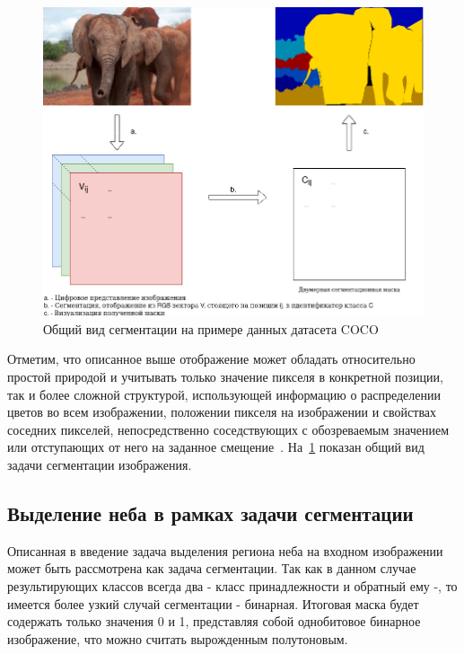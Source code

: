 \begin{figure}[H]
    \centering
    \includegraphics[width=\textwidth]{img/example_segmentation.png}
    \caption{Общий вид сегментации на примере данных датасета COCO}
    \label{fig:seg_example}
\end{figure}

Отметим, что описанное выше отображение может обладать относительно простой природой и учитывать только значение пикселя в конкретной позиции,
так и более сложной структурой, использующей информацию о распределении цветов во всем изображении, положении пикселя на изображении и
свойствах соседних пикселей, непосредственно соседствующих с обозреваемым значением или отступающих от него на заданное смещение~\autocite{liu2018recent}.
На~\ref{fig:seg_example} показан общий вид задачи сегментации изображения.

\subsection{Выделение неба в рамках задачи сегментации}

Описанная в введение задача выделения региона неба на входном изображении может быть рассмотрена как задача сегментации.
Так как в данном случае результирующих классов всегда два - класс принадлежности и обратный ему -, то имеется более узкий случай сегментации - бинарная.
Итоговая маска будет содержать только значения 0 и 1, представляя собой однобитовое бинарное изображение, что можно считать вырожденным полутоновым.


